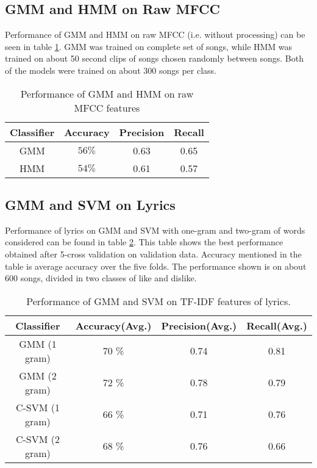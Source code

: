 \subsection{GMM and HMM on Raw MFCC} Performance of GMM and HMM on raw MFCC (i.e. without processing) can be seen in table \ref{tab:raw}. GMM was trained on complete set of songs, while HMM was trained on about 50 second clips of songs chosen randomly between songs. Both of the models were trained on about 300 songs per class.
\begin{table}[!htbp]

\centering
\begin{tabular}{ |c|c|c|c| } 
 \hline
 Classifier & Accuracy & Precision & Recall \\ \hline
  GMM & $56\%$ & 0.63 & 0.65 \\ \hline
 HMM & $54\%$ & 0.61 & 0.57 \\ \hline
 
 \hline
\end{tabular}
\caption{Performance of GMM and HMM on raw MFCC features}
\label{tab:raw}
\end{table}


\subsection{GMM and SVM on Lyrics} Performance of lyrics on GMM and SVM with one-gram and two-gram of words considered can be found in table \ref{tab:lyric}. This table shows the best performance obtained after 5-cross validation on validation data. Accuracy mentioned in the table is average accuracy over the five folds. The performance shown is on about 600 songs, divided in two classes of like and dislike. 
\begin{table}[!htbp]

\centering
\begin{tabular}{ |c|c|c|c| } 
 \hline
 Classifier & Accuracy(Avg.) & Precision(Avg.) & Recall(Avg.) \\ \hline
 GMM (1 gram) & 70 \% & 0.74 & 0.81 \\ 
 GMM (2 gram) & 72 \% & 0.78 & 0.79\\
 C-SVM (1 gram) & 66 \% & 0.71  & 0.76\\ 
 C-SVM (2 gram) & 68 \% & 0.76 & 0.66\\ 
 
 \hline
\end{tabular}
\caption{Performance of GMM and SVM on TF-IDF features of lyrics.}
\label{tab:lyric}
\end{table}
